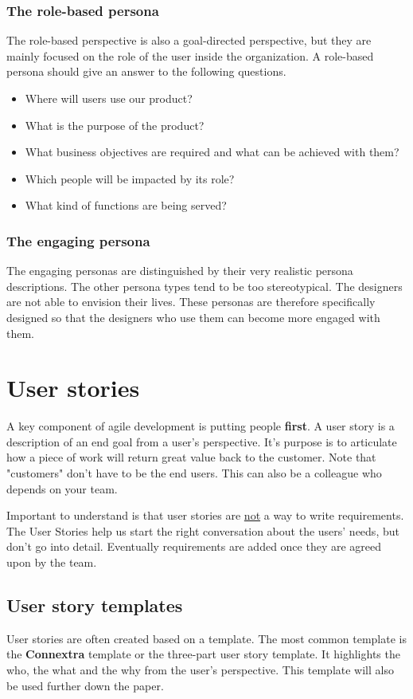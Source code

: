     \subsubsection{The role-based persona}
    The role-based perspective is also a goal-directed perspective, but they are mainly focused on the role of the user inside the organization. A role-based persona should give an answer to the following questions.
    \begin{itemize}
        \item{Where will users use our product?}
        \item{What is the purpose of the product?}
        \item{What business objectives are required and what can be achieved with them?}
        \item{Which people will be impacted by its role?}
        \item{What kind of functions are being served?}
    \end{itemize}
    
    \subsubsection{The engaging persona}
    
    The engaging personas are distinguished by their very realistic persona descriptions. The other persona types tend to be too stereotypical. The designers are not able to envision their lives. These personas are therefore specifically designed so that the designers who use them can become more engaged with them.
    
    \section{User stories}
    A key component of agile development is putting people \textbf{first}. A user story is a description of an end goal from a user's perspective. It's purpose is to articulate how a piece of work will return great value back to the customer. Note that "customers" don't have to be the end users. This can also be a colleague who depends on your team.
    
    Important to understand is that user stories are \underline{not} a way to write requirements. The User Stories help us start the right conversation about the users' needs, but don't go into detail. Eventually requirements are added once they are agreed upon by the team.
    
    \subsection{User story templates}
        User stories are often created based on a template. The most common template is the \textbf{Connextra} template or the three-part user story template. It highlights the who, the what and the why from the user's perspective. This template will also be used further down the paper.
        
